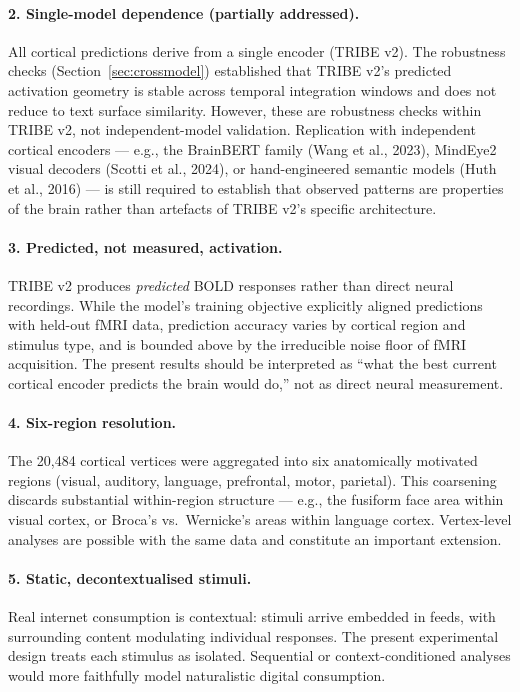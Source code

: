 \documentclass[11pt,letterpaper]{article}
\numberwithin{equation}{section}
\begin{document}
\paragraph{2. Single-model dependence (partially addressed).} All cortical predictions derive from a single encoder (TRIBE v2). The robustness checks (Section~\ref{sec:crossmodel}) established that TRIBE v2's predicted activation geometry is stable across temporal integration windows and does not reduce to text surface similarity. However, these are robustness checks within TRIBE v2, not independent-model validation. Replication with independent cortical encoders --- e.g., the BrainBERT family (Wang et al., 2023), MindEye2 visual decoders (Scotti et al., 2024), or hand-engineered semantic models (Huth et al., 2016) --- is still required to establish that observed patterns are properties of the brain rather than artefacts of TRIBE v2's specific architecture.

\paragraph{3. Predicted, not measured, activation.} TRIBE v2 produces \textit{predicted} BOLD responses rather than direct neural recordings. While the model's training objective explicitly aligned predictions with held-out fMRI data, prediction accuracy varies by cortical region and stimulus type, and is bounded above by the irreducible noise floor of fMRI acquisition. The present results should be interpreted as ``what the best current cortical encoder predicts the brain would do,'' not as direct neural measurement.

\paragraph{4. Six-region resolution.} The 20{,}484 cortical vertices were aggregated into six anatomically motivated regions (visual, auditory, language, prefrontal, motor, parietal). This coarsening discards substantial within-region structure --- e.g., the fusiform face area within visual cortex, or Broca's vs.\ Wernicke's areas within language cortex. Vertex-level analyses are possible with the same data and constitute an important extension.

\paragraph{5. Static, decontextualised stimuli.} Real internet consumption is contextual: stimuli arrive embedded in feeds, with surrounding content modulating individual responses. The present experimental design treats each stimulus as isolated. Sequential or context-conditioned analyses would more faithfully model naturalistic digital consumption.
\end{document}
